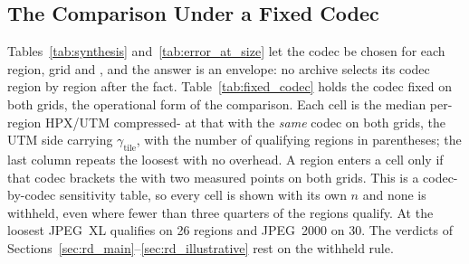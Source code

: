 \subsection{The Comparison Under a Fixed Codec}
\label{sec:same_codec}

Tables~\ref{tab:synthesis} and~\ref{tab:error_at_size} let the codec
be chosen for each region, grid and , and the answer is an
envelope: no archive selects its codec region by region after the fact.
Table~\ref{tab:fixed_codec} holds the codec fixed on both grids, the
operational form of the comparison. Each cell is the median per-region
HPX/UTM compressed- at that  with the \emph{same} codec
on both grids, the UTM side carrying $\gamma_{\mathrm{tile}}$, with the
number of qualifying regions in parentheses; the last column repeats
the loosest  with no overhead. A region enters a cell only
if that codec brackets the  with two measured points on both
grids. This is a codec-by-codec sensitivity table, so every cell is
shown with its own $n$ and none is withheld, even where fewer than three
quarters of the regions qualify. At the loosest  JPEG~XL qualifies
on 26 regions and JPEG~2000 on 30. The verdicts of
Sections~\ref{sec:rd_main}--\ref{sec:rd_illustrative} rest on the
withheld rule.



